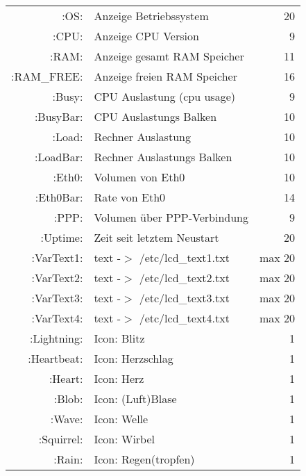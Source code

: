 \begin{description}
\begin{small}
\begin{center}
\begin{longtable}{rp{7cm}r}
                    :OS: &       Anzeige Betriebssystem      &  20 \\
                   :CPU: &       Anzeige CPU Version         &   9 \\
                   :RAM: &       Anzeige gesamt RAM Speicher &  11 \\
             :RAM\_FREE: &       Anzeige freien RAM Speicher &  16 \\                   
                  :Busy: &       CPU Auslastung (cpu usage)  &   9 \\
               :BusyBar: &       CPU Auslastungs Balken      &  10 \\
                  :Load: &       Rechner Auslastung          &  10 \\
               :LoadBar: &       Rechner Auslastungs Balken  &  10 \\
                  :Eth0: &       Volumen von Eth0            &  10 \\
               :Eth0Bar: &       Rate von Eth0               &  14 \\
                   :PPP: &       Volumen über PPP-Verbindung &   9 \\
                :Uptime: &       Zeit seit letztem Neustart  &  20 \\

              :VarText1: &       text -$>$ /etc/lcd\_text1.txt  & max 20 \\
              :VarText2: &       text -$>$ /etc/lcd\_text2.txt  & max 20 \\
              :VarText3: &       text -$>$ /etc/lcd\_text3.txt  & max 20 \\
              :VarText4: &       text -$>$ /etc/lcd\_text4.txt  & max 20 \\

             :Lightning: &       Icon: Blitz             &  1 \\
             :Heartbeat: &       Icon: Herzschlag        &  1 \\
                 :Heart: &       Icon: Herz              &  1 \\
                  :Blob: &       Icon: (Luft)Blase       &  1 \\
                  :Wave: &       Icon: Welle             &  1 \\
              :Squirrel: &       Icon: Wirbel            &  1 \\
                  :Rain: &       Icon: Regen(tropfen)    &  1 \\


\end{longtable}
\end{center}
\end{small}
\end{description}
